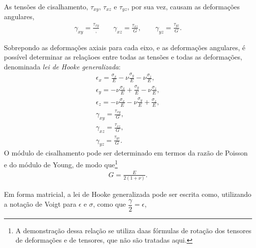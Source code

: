 As tensões de cisalhamento, $\tau_{xy}$, $\tau_{xz}$ e $\tau_{yz}$, por sua vez, causam as deformações angulares,
\begin{gather}
    \gamma_{xy} = \frac{\tau_{xy}}, \qquad \gamma_{xz} = \frac{\tau_{xz}}{G}, \qquad \gamma_{yz} = \frac{\tau_{yz}}{G}.
\end{gather}

Sobrepondo as deformações axiais para cada eixo, e as deformações angulares, é possível determinar as relaçãoes entre todas as tensões e todas as deformações, denominada \emph{lei de Hooke generalizada}:
\begin{gather}
    \epsilon_x = \frac{\sigma_x}{E} - \nu \frac{\sigma_y}{E} - \nu \frac{\sigma_z}{E}, \\
    \epsilon_y = -\nu \frac{\sigma_x}{E} + \frac{\sigma_y}{E} - \nu \frac{\sigma_z}{E}, \\
    \epsilon_z = -\nu \frac{\sigma_x}{E} - \nu \frac{\sigma_y}{E} + \frac{\sigma_z}{E}, \\
    \gamma_{xy} = \frac{\tau_{xy}}{G}, \\ 
    \gamma_{xz} = \frac{\tau_{xz}}{G}, \\
    \gamma_{yz} = \frac{\tau_{yz}}{G}.
    \label{eq:lei_de_hooke_generalizada}
\end{gather}
O módulo de cisalhamento pode ser determinado em termos da razão de Poisson e do módulo de Young, de modo que\footnote{A demonstração dessa relação se utiliza daas fórmulas de rotação dos tensores de deformações e de tensores, que não são tratadas aqui.}
\begin{gather}
    G = \frac{E}{2(1+\nu)}.
\end{gather}

Em forma matricial, a lei de Hooke generalizada pode ser escrita como, utilizando a notação de Voigt para ${\epsilon}$ e ${\sigma}$, como que $\dfrac{\gamma}{2} = \epsilon$,

